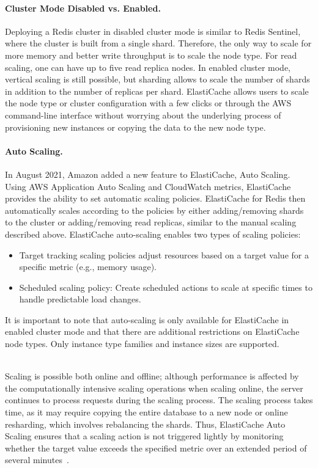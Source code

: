 \paragraph{Cluster Mode Disabled vs. Enabled.}
Deploying a Redis cluster in disabled cluster mode is similar to Redis Sentinel, where the cluster is built from a single shard. Therefore, the only way to scale for more memory and better write throughput is to scale the node type. For read scaling, one can have up to five read replica nodes. In enabled cluster mode, vertical scaling is still possible, but sharding allows to scale the number of shards in addition to the number of replicas per shard. ElastiCache allows users to scale the node type or cluster configuration with a few clicks or through the AWS command-line interface without worrying about the underlying process of provisioning new instances or copying the data to the new node type.

\paragraph{Auto Scaling.}
In August 2021, Amazon added a new feature to ElastiCache, Auto Scaling. Using AWS Application Auto Scaling and CloudWatch metrics, ElastiCache provides the ability to set automatic scaling policies. ElastiCache for Redis then automatically scales according to the policies by either adding/removing shards to the cluster or adding/removing read replicas, similar to the manual scaling described above. ElastiCache auto-scaling enables two types of scaling policies:
\begin{itemize}
  \item Target tracking scaling policies adjust resources based on a target value for a specific metric (e.g., memory usage).
  \item Scheduled scaling policy: Create scheduled actions to scale at specific times to handle predictable load changes.
\end{itemize}
It is important to note that auto-scaling is only available for ElastiCache in enabled cluster mode and that there are additional restrictions on ElastiCache node types. Only instance type families  and instance sizes  are supported.

~\\
Scaling is possible both online and offline; although performance is affected by the computationally intensive scaling operations when scaling online, the server continues to process requests during the scaling process. The scaling process takes time, as it may require copying the entire database to a new node or online resharding, which involves rebalancing the shards. Thus, ElastiCache Auto Scaling ensures that a scaling action is not triggered lightly by monitoring whether the target value exceeds the specified metric over an extended period of several minutes~\cite{noauthor_auto_nodate}.

